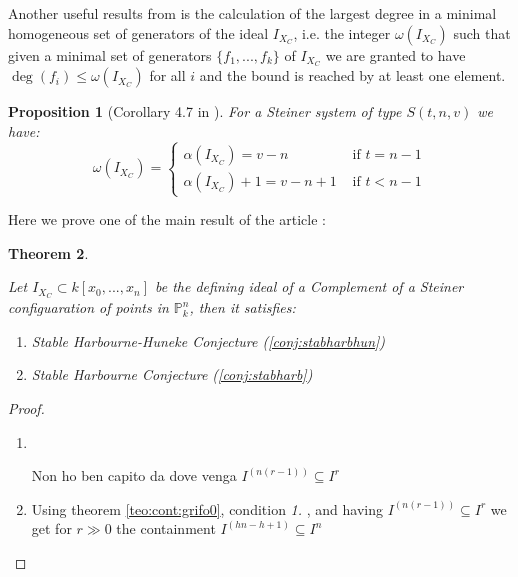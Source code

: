 \documentclass[]{book}
\theoremstyle{plain}
\newtheorem{teo}{Theorem}[section]
\newtheorem{prop}[teo]{Proposition}
\theoremstyle{remark}
\theoremstyle{definition}
\newcommand{\PP}{\mathbb{P}}
\newcommand{\cont}[2]{ I^{(#1)} \subseteq I^{#2}}
\begin{document}
Another useful results from \cite{Bal20Steiner} is the calculation of the largest degree in a minimal homogeneous set of generators of the ideal $ I_{X_C} $, i.e. the integer $ \omega (I_{X_	C}) $ such that given a minimal set of generators $\{ f_1 ,... , f_k\} $ of $ I_{X_	C} $ we are granted to have $ \deg (f_i) \leq \omega (I_{X_	C}) $ for all $ i $ and the bound is reached by at least one element. %

\begin{prop}[Corollary 4.7 in \cite{Bal20Steiner}]
\label{prop:largdeg}
For a Steiner system of type $ S(t,n,v) $ we have:
\begin{equation}\label{eq:largdeg}
\omega (I_{X_	C}) = 
\begin{cases}
\alpha (I_{X_	C})=v-n     & \text{ if } t = n-1\\
\alpha (I_{X_	C})+1=v-n +1 & \text{ if } t < n-1
\end{cases}
\end{equation}
\end{prop}

Here we prove one of the main result of the article \cite{Bal21Steiner}:
\begin{teo}\label{teo:cont:csteiner}

Let $ I_{X_C} \subset k[x_0 , ... , x_n]$ be the defining ideal of a Complement of a Steiner configuaration of points in $ \PP^n_k $, then it satisfies:
\begin{enumerate}
\item Stable Harbourne-Huneke Conjecture (\ref{conj:stabharbhun})
\item Stable Harbourne Conjecture (\ref{conj:stabharb})
\end{enumerate}
\end{teo}

\begin{proof}
\begin{enumerate}
\item \quad \\
\begin{tboxque}
Non ho ben capito da dove venga $ \cont{n(r-1)}{r} $
\end{tboxque}
\item Using theorem \ref{teo:cont:grifo0}, condition \textit{1.} , and having $ \cont{n(r-1)}{r} $ we get for $ r \gg 0 $ the containment $ \cont{hn - h +1}{n} $
\end{enumerate}
\end{proof}
\end{document}
